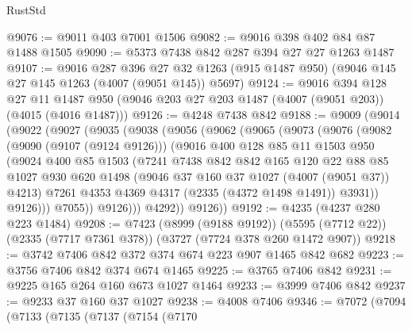 \begin{lexlean}{RustStd}
\begin{coremodule}
@9076 := @9011 @403 @7001 @1506
@9082 := @9016 @398 @402 @84 @87 @1488 @1505
@9090 := @5373 @7438 @842 @287 @394 @27 @27 @1263 @1487
@9107 := @9016
    @287
    @396
    @27
    @32
    @1263
    (@915 @1487 @950)
    (@9046 @145 @27 @145 @1263 (@4007 (@9051 @145)) @5697)
@9124 := @9016
    @394
    @128
    @27
    @11
    @1487
    @950
    (@9046 @203 @27 @203 @1487 (@4007 (@9051 @203)) (@4015 (@4016 @1487)))
@9126 := @4248 @7438 @842
@9188 := @9009
    (@9014
      (@9022
        (@9027
          (@9035
            (@9038
              (@9056
                (@9062
                  (@9065
                    (@9073
                      (@9076
                        (@9082
                          (@9090 (@9107 (@9124 @9126)))
                          (@9016
                            @400
                            @128
                            @85
                            @11
                            @1503
                            @950
                            (@9024
                              @400
                              @85
                              @1503
                              (@7241
                                @7438
                                @842
                                @842
                                @165
                                @120
                                @22
                                @88
                                @85
                                @1027
                                @930
                                @620
                                @1498
                                (@9046 @37 @160 @37 @1027 (@4007 (@9051 @37)) @4213)
                                @7261
                                @4353
                                @4369
                                @4317
                                (@2335 (@4372 @1498 @1491))
                                @3931))
                            @9126)))
                      @7055))
                  @9126)))
            @4292))
        @9126))
@9192 := @4235 (@4237 @280 @223 @1484)
@9208 := @7423
    (@8999 (@9188 @9192))
    (@5595 (@7712 @22))
    (@2335 (@7717 @7361 @378))
    (@3727 (@7724 @378 @260 @1472 @907))
@9218 := @3742 @7406 @842 @372 @374 @674 @223 @907 @1465 @842 @682
@9223 := @3756 @7406 @842 @374 @674 @1465
@9225 := @3765 @7406 @842
@9231 := @9225 @165 @264 @160 @673 @1027 @1464
@9233 := @3999 @7406 @842
@9237 := @9233 @37 @160 @37 @1027
@9238 := @4008 @7406
@9346 := @7072
    (@7094
      (@7133
        (@7135
          (@7137
            (@7154
              (@7170

\end{coremodule}
\end{lexlean}
